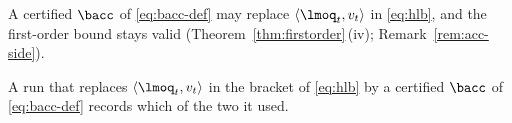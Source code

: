 
A certified $\bacc$ of \eqref{eq:bacc-def} may replace $\langle\lmoq_t,v_t\rangle$ in
\eqref{eq:hlb}, and the first-order bound stays valid
(Theorem~\ref{thm:firstorder}\,(iv); Remark~\ref{rem:acc-side}).

\begin{requirement}\label{req:bacc-recorded}
A run that replaces $\langle\lmoq_t,v_t\rangle$ in the bracket of
\eqref{eq:hlb} by a certified $\bacc$ of \eqref{eq:bacc-def} records which of
the two it used.
\end{requirement}
